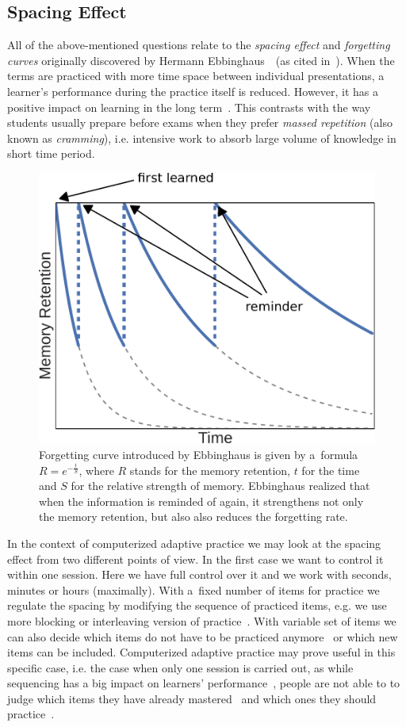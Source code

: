 \documentclass[table,color,cover,twoside,nolot,nolof]{fithesis3/fithesis3}
\begin{document}
\subsection{Spacing Effect}
\label{section:spacing_effect}
All of the above-mentioned questions relate to the \emph{spacing
effect} and \emph{forgetting curves} originally discovered by Hermann
Ebbinghaus~\cite{ebbinghaus1885spacing}~(as cited
in~\cite{pavlik2005practice}). When the terms are practiced with more time
space between individual presentations, a learner's performance during the
practice itself is reduced. However, it has a positive impact on
learning in the long term~\cite{maass2015how, kornell2009optimising}. This
contrasts with the way students usually prepare before exams when they prefer
\emph{massed repetition} (also known as \emph{cramming}), i.e. intensive work
to absorb large volume of knowledge in short time period.

\begin{figure}
	\begin{center}
		\includegraphics[width=.6\textwidth]{figure/forgetting_curves}
		\caption{Forgetting curve introduced by Ebbinghaus is given by a~formula $R
			= e^{-\frac{t}{S}}$, where $R$ stands for the memory retention, $t$
			for the time and $S$ for the relative strength of memory. Ebbinghaus
			realized that when the information is reminded of again, it strengthens not
			only the memory retention, but also also reduces the forgetting rate.}
	\end{center}
\end{figure}

In the context of computerized adaptive practice we may look at the spacing
effect from two different points of view. In the first case we want to control
it within one session. Here we have full control over it and we work with
seconds, minutes or hours (maximally). With a~fixed number of items for
practice we regulate the spacing by modifying the sequence of practiced items,
e.g. we use more blocking or interleaving version of
practice~\cite{ostrow2015blocking}. With variable set of items we can also
decide which items do not have to be practiced
anymore~\cite{kornell2008optimising} or which new items can be included.
Computerized adaptive practice may prove useful in this specific case, i.e. the
case when only one session is carried out, as while sequencing has a big
impact on learners' performance~\cite{ostrow2015blocking}, people are not able to
to judge which items they have already mastered~\cite{kornell2008optimising}
and which ones they should practice~\cite{kornell2014focusing}.
\end{document}
